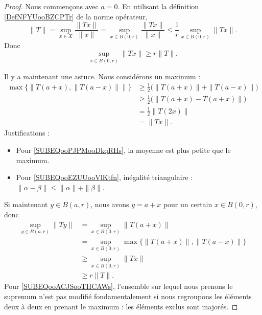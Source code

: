 \begin{proof}
    Nous commençons avec \( a=0\). En utilisant la définition \ref{DefNFYUooBZCPTr} de la norme opérateur,
    \begin{equation}
        \| T \|=\sup_{x\in X}\frac{ \| Tx \| }{ \| x \| }=\sup_{x\in B(0,r)}\frac{ \| Tx \| }{ \| x \| }\leq \frac{1}{ r }\sup_{x\in B(0,r)}\| Tx \|.
    \end{equation}
    Donc
    \begin{equation}
        \sup_{x\in B(0,r)}\| Tx \|\geq r\| T \|.
    \end{equation}
    
    Il y a maintenant une astuce. Nous considérons un maximum :
    \begin{subequations}
        \begin{align}
            \max\{ \| T(a+x),\| T(a-x) \| \| \}&\geq \frac{ 1 }{2}\big( \| T(a+x) \|+\| T(a-x) \| \big) \label{SUBEQooPJPMooDkqRHs}\\
            &\geq \frac{ 1 }{2}\big( \| T(a+x)-T(a+x) \| \big)      \label{SUBEQooEZUUooVlKtfn}\\
            &=\frac{ 1 }{2}\| T(2x) \|\\
            &=\| Tx \|.
        \end{align}
    \end{subequations}
    Justifications :
    \begin{itemize}
        \item Pour \eqref{SUBEQooPJPMooDkqRHs}, la moyenne est plus petite que le maximum.
        \item Pour \eqref{SUBEQooEZUUooVlKtfn}, inégalité triangulaire : \( \| \alpha-\beta \|\leq \| \alpha \|+\| \beta \|\).
    \end{itemize}
    Si maintenant \( y\in B(a,r)\), nous avons \( y=a+x\) pour un certain \( x\in B(0,r)\), donc
    \begin{subequations}
        \begin{align}
            \sup_{y\in B(a,r)}\| Ty \|&=\sup_{x\in B(0,r)}\| T(a+x) \|\\
            &=\sup_{x\in B(0,r)}\max\{ \| T(a+x) \|, \| T(a-x) \| \}        \label{SUBEQooACJSooTHCAWs}\\
            &\geq \sup_{x\in B(0,r)}\| Tx \|\\
            &\geq r\| T \|.
        \end{align}
    \end{subequations}
    Pour \eqref{SUBEQooACJSooTHCAWs}, l'ensemble sur lequel nous prenons le supremum n'est pas modifié fondamentalement si nous regroupons les éléments deux à deux en prenant le maximum : les éléments exclus sont majorés.
\end{proof}

